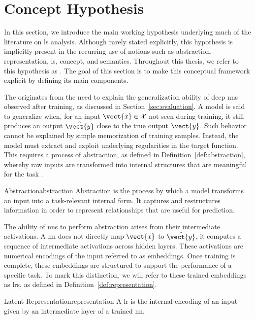 \section{Concept Hypothesis}
\label{sec:concept_hypothesis}

In this section, we introduce the main working hypothesis underlying much of the literature on \gls{ls} analysis.  
Although rarely stated explicitly, this hypothesis is implicitly present in the recurring use of notions such as abstraction, representation, \gls{ls}, concept, and semantics.
Throughout this thesis, we refer to this hypothesis as \ConceptHypothesisName.
The goal of this section is to make this conceptual framework explicit by defining its main components.  

The \ConceptHypothesisName originates from the need to explain the generalization ability of deep \glspl{nn} observed after training, as discussed in Section~\ref{sec:evaluation}.
A model is said to generalize when, for an input $\vect{x} \in \mathcal{X}$ not seen during training, it still produces an output $\hat{\vect{y}}$ close to the true output $\vect{y}$.  
Such behavior cannot be explained by simple memorization of training samples.  
Instead, the model must extract and exploit underlying regularities in the target function.  
This requires a process of abstraction, as defined in Definition~\ref{def:abstraction}, whereby raw inputs are transformed into internal structures that are meaningful for the task \parencite{bengio2014representationlearningreviewnew}.  

\begin{definition}{Abstraction}{abstraction}
Abstraction is the process by which a model transforms an input into a task-relevant internal form.  
It captures and restructures information in order to represent relationships that are useful for prediction.  
\end{definition}

The ability of \glspl{nn} to perform abstraction arises from their intermediate activations.
A \gls{nn} does not directly map $\vect{x}$ to $\hat{\vect{y}}$, it computes a sequence of intermediate activations across hidden layers.
These activations are numerical encodings of the input referred to as embeddings.
Once training is complete, these embeddings are structured to support the performance of a specific task.
To mark this distinction, we will refer to these trained embeddings as \glspl{lr}, as defined in Definition~\ref{def:representation}.

\begin{definition}{Latent Representation}{representation}
A \gls{lr} is the internal encoding of an input given by an intermediate layer of a trained \gls{nn}.
\end{definition}

